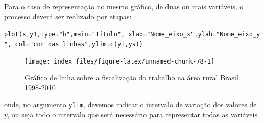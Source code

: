 \documentclass[12pt,brazil,oneside]{book}
\newenvironment{Shaded}{\begin{snugshade}}{\end{snugshade}}
\newcommand{\DataTypeTok}[1]{\textcolor[rgb]{0.13,0.29,0.53}{#1}}
\newcommand{\DecValTok}[1]{\textcolor[rgb]{0.00,0.00,0.81}{#1}}
\newcommand{\KeywordTok}[1]{\textcolor[rgb]{0.13,0.29,0.53}{\textbf{#1}}}
\newcommand{\NormalTok}[1]{#1}
\newcommand{\OperatorTok}[1]{\textcolor[rgb]{0.81,0.36,0.00}{\textbf{#1}}}
\newcommand{\StringTok}[1]{\textcolor[rgb]{0.31,0.60,0.02}{#1}}
\begin{document}
Para o caso de representação no mesmo gráfico, de duas ou mais
variáveis, o processo deverá ser realizado por etapas:

\texttt{plot(x,y1,type="b",main="Título",\ xlab="Nome\_eixo\_x",ylab="Nome\_eixo\_y",\ col="cor\ das\ linhas",ylim=c(yi,ys))}

\begin{Shaded}
\end{Shaded}

\begin{figure}[H]

{\centering \texttt{[image: index\_files/figure-latex/unnamed-chunk-78-1]} 

}

\caption{Gráfico de linha sobre a fiscalização do trabalho na área rural Brasil 1998-2010}\label{fig:unnamed-chunk-78}
\end{figure}

onde, no argumento \texttt{ylim}, devemos indicar o intervalo de
variação dos valores de y, ou seja todo o intervalo que será necessário
para representar todas as variáveis.
\end{document}
